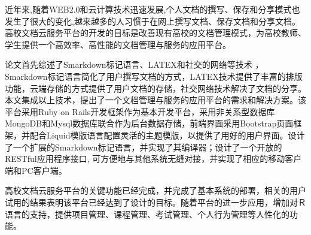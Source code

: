 
\begin{cabstract}
近年来,随着WEB2.0和云计算技术迅速发展,个人文档的撰写、保存和分享模式也发生了很大的变化,越来越多的人习惯于在网上撰写文档、保存文档和分享文档。高校文档云服务平台的开发的目标是改善现有高校的文档管理模式，为高校教师、学生提供一个高效率、高性能的文档管理与服务的应用平台。

论文首先综述了Smarkdown标记语言、LATEX和社交的网络等技术 ，Smarkdown标记语言简化了用户撰写文档的方式，LATEX技术提供了丰富的排版功能，云端存储的方式提供了用户文档的存储，社交网络技术解决了文档的分享。本文集成以上技术，提出了一个文档管理与服务的应用平台的需求和解决方案。该平台采用Ruby on Rails开发框架作为基本开发平台，采用非关系型数据库MongoDB和Mysql数据库联合作为后台数据存储，前端界面采用Bootstrap页面框架，并配合Liquid模版语言配置灵活的主题模版，以提供了用好的用户界面。设计了一个扩展的Smarkdown标记语言，并实现了其编译器；设计了一个开放的RESTful应用程序接口, 可方便地与其他系统无缝对接，并实现了相应的移动客户端和PC客户端。

高校文档云服务平台的关键功能已经完成，并完成了基本系统的部署，相关的用户试用的结果表明该平台已经达到了设计的目标。随着平台的进一步应用，增加对Ｒ语言的支持，提供项目管理、课程管理、考试管理、个人行为管理等人性化的功能。
\end{cabstract}


